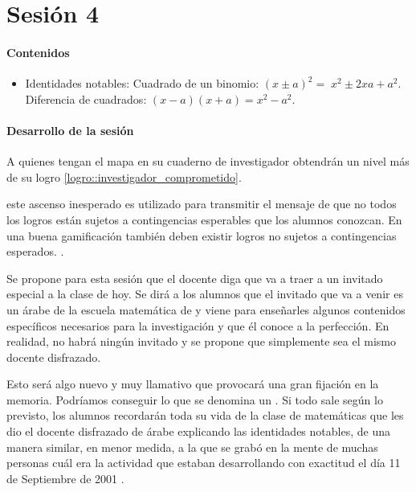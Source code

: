 
\section{Sesión 4}


\paragraph{Contenidos}
\begin{itemize}
	\item Identidades notables: 
	\subitem Cuadrado de un binomio: $(x\pm a)^2 = \;x^2\pm 2xa + a^2$.
	\subitem Diferencia de cuadrados: $(x-a)(x+a) = x^2-a^2$.
\end{itemize}

\paragraph{Desarrollo de la sesión}

A quienes tengan el mapa en su cuaderno de investigador obtendrán un nivel más de su logro \ref{logro::investigador_comprometido}.

\Justificacion{} este ascenso inesperado es utilizado para transmitir el mensaje de que no todos los logros están sujetos a contingencias esperables que los alumnos conozcan.
%
En una buena gamificación también deben existir logros no sujetos a contingencias esperados. \citep{werbach2012win}.

Se propone para esta sesión que el docente diga que va a traer a un invitado especial a la clase de hoy.
%
Se dirá a los alumnos que el invitado que va a venir es un árabe de la escuela matemática de \arab y viene para enseñarles algunos contenidos específicos necesarios para la investigación y que él conoce a la perfección.
%
En realidad, no habrá ningún invitado y se propone que simplemente sea el mismo docente disfrazado.

Esto será algo nuevo y muy llamativo que provocará una gran fijación en la memoria.
%
Podríamos conseguir lo que se denomina un .
Si todo sale según lo previsto, los alumnos recordarán toda su vida de la clase de matemáticas que les dio el docente disfrazado de árabe explicando las identidades notables, 
%
de una manera similar, en menor medida, a la que se grabó en la mente de muchas personas cuál era la actividad que estaban desarrollando con exactitud el día 11 de Septiembre de 2001 \citep{11s}.

